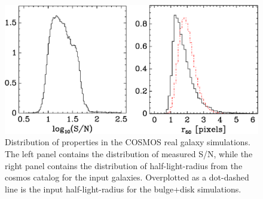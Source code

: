 \documentclass[usegraphicx,usenatbib]{mn2e}
\begin{document}
\begin{figure}
    \centering
    \includegraphics[scale=0.45]{mcal-v14s01-s2n-and-r50.eps}

    \caption{Distribution of properties in the COSMOS real galaxy simulations. The
    left panel contains the distribution of measured S/N, while the right panel contains
    the distribution of half-light-radius from the cosmos catalog for the input
    galaxies.  Overplotted as a dot-dashed line is the input half-light-radius
    for the bulge+disk simulations.}

\label{fig:cosmos}
\end{figure}
\end{document}

